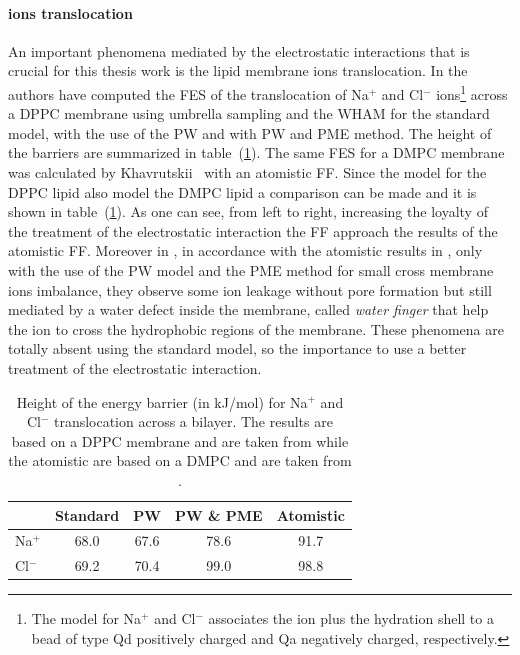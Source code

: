 \paragraph{\textbf{ions translocation}} An important phenomena mediated by the electrostatic interactions that is crucial for this thesis work is the lipid membrane ions translocation. In \cite{PW} the authors have computed the \ac{FES} of the translocation of Na$^+$ and Cl$^-$ ions\footnote{The \martini model for Na$^+$ and Cl$^-$ associates the ion plus the hydration shell to a bead of type Qd positively charged and Qa negatively charged, respectively.} across a \acs{DPPC} membrane using umbrella sampling and the \ac{WHAM} for the standard \martini model, with the use of the \ac{PW} and with \ac{PW} and \ac{PME} method. The height of the barriers are summarized in table~(\ref{tab:ionTranslocation}). The same \ac{FES} for a \acs{DMPC} membrane was calculated by Khavrutskii \etal\, \cite{atomisticTranslocation} with an atomistic \ac{FF}. Since the \martini model for the \acs{DPPC} lipid also model the \acs{DMPC} lipid a comparison can be made and it is shown in table~(\ref{tab:ionTranslocation}). As one can see, from left to right, increasing the loyalty of the treatment of the electrostatic interaction the \martini \ac{FF} approach the results of the atomistic \ac{FF}. Moreover in \cite{PW}, in accordance with the atomistic results in \cite{atomisticTranslocation}, only with the use of the \ac{PW} model and the \ac{PME} method for small cross membrane ions imbalance, they observe some ion leakage without pore formation but still mediated by a water defect inside the membrane, called \textit{water finger} that help the ion to cross the hydrophobic regions of the membrane. These phenomena are totally absent using the standard \martini model, so the importance to use a better treatment of the electrostatic interaction.
\begin{table}
	\centering
	\begin{tabular}{lcccc}
		\toprule
		\,		& Standard & \acs{PW} & \acs{PW} \& \acs{PME} & Atomistic	\\ \toprule
		Na$^+$	& 68.0	   & 67.6	  & 78.6					& 91.7 		\\ \midrule
		Cl$^-$	& 69.2	   & 70.4	  & 99.0					& 98.8		\\ \bottomrule
	\end{tabular}
	\caption{Height of the energy barrier (in kJ/mol) for Na$^+$ and Cl$^-$ translocation across a bilayer. The \martini results are based on a \acs{DPPC} membrane and are taken from \cite{PW} while the atomistic are based on a \acs{DMPC} and are taken from \cite{atomisticTranslocation}.}
	\label{tab:ionTranslocation}
\end{table}

